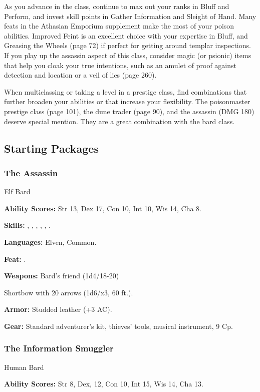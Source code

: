 As you advance in the class, continue to max out your ranks in Bluff and Perform, and invest skill points in Gather Information and Sleight of Hand. Many feats in the Athasian Emporium supplement make the most of your poison abilities. Improved Feint is an excellent choice with your expertise in Bluff, and Greasing the Wheels (page 72) if perfect for getting around templar inspections. If you play up the assassin aspect of this class, consider magic (or psionic) items that help you cloak your true intentions, such as an amulet of proof against detection and location or a veil of lies (page 260).

When multiclassing or taking a level in a prestige class, find combinations that further broaden your abilities or that increase your flexibility. The poisonmaster prestige class (page 101), the dune trader (page 90), and the assassin (DMG 180) deserve special mention. They are a great combination with the bard class.

\subsection{Starting Packages}
\subsubsection{The Assassin}
Elf Bard

\textbf{Ability Scores:} Str 13, Dex 17, Con 10, Int 10, Wis 14, Cha 8.

\textbf{Skills:} , , , , , .

\textbf{Languages:} Elven, Common.

\textbf{Feat:} .

\textbf{Weapons:} Bard's friend (1d4/18-20)

Shortbow with 20 arrows (1d6/x3, 60 ft.).

\textbf{Armor:} Studded leather (+3 AC).

\textbf{Gear:} Standard adventurer's kit, thieves' tools, musical instrument, 9 Cp.

\subsubsection{The Information Smuggler}
Human Bard

\textbf{Ability Scores:} Str 8, Dex, 12, Con 10, Int 15, Wis 14, Cha 13.

